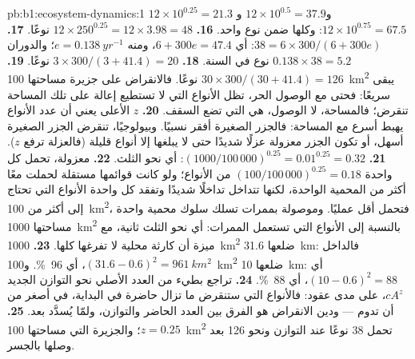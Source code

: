 \begin{solution}{pb:b1:ecosystem-dynamics:1}
$12\times 10^{0.25} = 21.3$ و$12\times 10^{0.5} = 37.9$ و$12\times
10^{0.75} = 67.5$: وكلها ضمن نوع واحد.
\textbf{16.} $12\times 250^{0.25} = 12\times 3.98 = 48$ نوعًا.
\textbf{17.} $38 = 6\times 300/(6 + 300e)$: أي $6 + 300e = 47.4$، ومنه $e =
\qty{0.138}{yr^{-1}}$؛ والدوران $0.138\times 38 = 5.2$ نوع في السنة.
\textbf{18.} $3\times 300/(3 + 41.4) = 20$ نوعًا.
\textbf{19.} $30\times 300/(30 + 41.4) = 126$ نوعًا. فالانقراض على
جزيرة مساحتها \qty{100}{km^2} يبقى سريعًا: فحتى مع الوصول الحر، تظل
الأنواع التي لا تستطيع إعالة  على تلك المساحة تنقرض؛
فالمساحة، لا الوصول، هي التي تضع السقف.
\textbf{20.} $z$ الأعلى يعني أن عدد الأنواع يهبط أسرع مع
المساحة: فالجزر الصغيرة أفقر نسبيًا. وبيولوجيًا، تنقرض 
الجزر الصغيرة أسهل، أو تكون الجزر معزولة عزلًا شديدًا
حتى لا يبلغها إلا أنواع قليلة (فالعزلة ترفع $z$).
\textbf{21.} $(1000/100\,000)^{0.25} = 0.01^{0.25} = 0.32$: أي نحو
الثلث.
\textbf{22.} معزولة، تحمل كل واحدة $(100/100\,000)^{0.25} = 0.18$ من
الأنواع؛ ولو كانت قوائمها مستقلة لحملت معًا
أكثر من المحمية الواحدة، لكنها تتداخل تداخلًا شديدًا وتفقد كل واحدة
الأنواع التي تحتاج إلى أكثر من \qty{100}{km^2}، فتحمل أقل عمليًا.
وموصولة بممرات تسلك سلوك محمية واحدة مساحتها \qty{1000}{km^2} بالنسبة إلى
الأنواع التي تستعمل الممرات: أي نحو الثلث ثانية، مع
ميزة أن كارثة محلية لا تفرغها كلها.
\textbf{23.} \qty{1000}{km^2} ضلعها \qty{31.6}{km}: فالداخل
$(31.6 - 0.6)^2 = \qty{961}{km^2}$، أي \qty{96}{\%}. و\qty{100}{km^2}
ضلعها \qty{10}{km}: أي $(10 - 0.6)^2 = 88$، أي \qty{88}{\%}.
\textbf{24.} تراجع بطيء من العدد الأصلي نحو التوازن
الجديد $cA^z$، على مدى عقود: فالأنواع التي ستنقرض
ما تزال حاضرة في البداية، في  أصغر من أن تدوم ---
ودين الانقراض هو الفرق بين العدد الحاضر
والتوازن، ولمّا يُسدَّد بعد.
\textbf{25.} $z = 0.25$؛ والجزيرة التي مساحتها \qty{100}{km^2} تحمل \num{38}
نوعًا عند التوازن ونحو \num{126} بعد وصلها بالجسر.
\end{solution}
